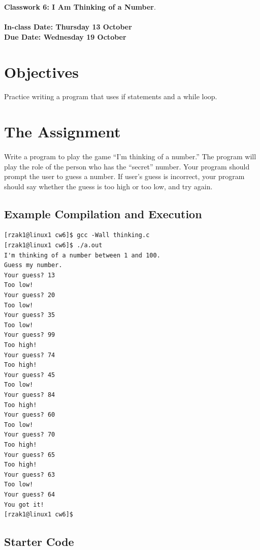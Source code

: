 \documentclass[letter,11pt]{article}
\begin{document}
\huge
\textbf{Classwork 6: I Am Thinking of a Number}.
\normalsize
\\ ~~ \\
\textbf{In-class Date: Thursday 13 October} \\
\textbf{Due Date: Wednesday 19 October}

\section*{Objectives}
\paragraph{}Practice writing a program that uses if statements and a while loop.

\section*{The Assignment}
\paragraph{}Write a program to play the game ``I'm thinking of a number.'' The program will play the role of the person who has the ``secret'' number. Your program should prompt the user to guess a number. If user's guess is incorrect, your program should say whether the guess is too high or too low, and try again.

\subsection*{Example Compilation and Execution}
\begin{verbatim}
[rzak1@linux1 cw6]$ gcc -Wall thinking.c
[rzak1@linux1 cw6]$ ./a.out
I'm thinking of a number between 1 and 100.
Guess my number.
Your guess? 13
Too low!
Your guess? 20
Too low!
Your guess? 35
Too low!
Your guess? 99
Too high!
Your guess? 74
Too high!
Your guess? 45
Too low!
Your guess? 84
Too high!
Your guess? 60
Too low!
Your guess? 70
Too high!
Your guess? 65
Too high!
Your guess? 63
Too low!
Your guess? 64
You got it!
[rzak1@linux1 cw6]$ 
\end{verbatim}

\subsection*{Starter Code}
\end{document}
